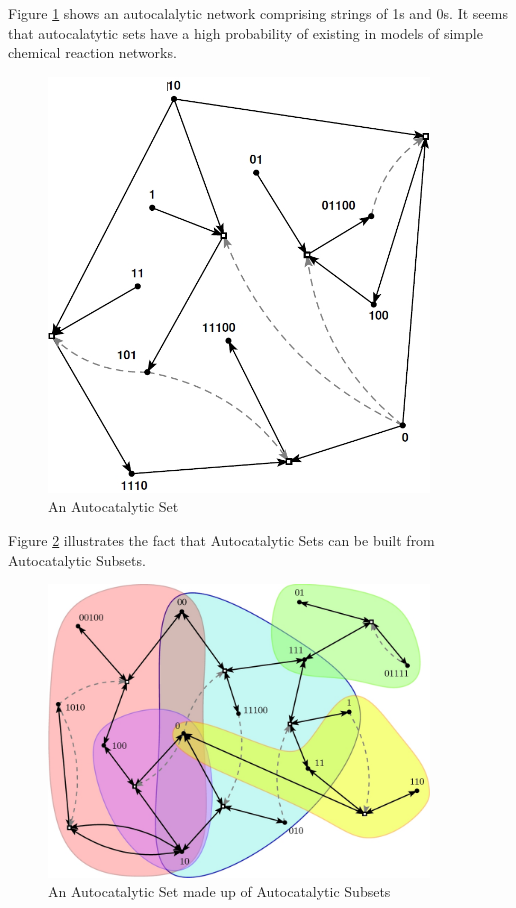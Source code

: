 \documentclass[]{article}
\begin{document}
Figure \ref{fig:AutoCatalytic2} shows an autocalalytic network comprising strings of 1s and 0s\cite{hordijk2012structure}. It seems that autocalatytic sets have a high probability of existing in models of simple chemical reaction networks.
\begin{figure}[H]
	\caption{An Autocatalytic Set}\label{fig:AutoCatalytic2}
	\includegraphics[width=0.9\textwidth]{AutoCatalytic2}
\end{figure}

Figure \ref{fig:AutoCatalyticSubsets} illustrates  the fact that Autocatalytic Sets can be built from Autocatalytic Subsets\cite{hordijk2017chasing}.
\begin{figure}[H]
	\caption{An Autocatalytic Set made up of Autocatalytic Subsets}\label{fig:AutoCatalyticSubsets}
	\includegraphics[width=0.9\textwidth]{AutoCatalyticSubsets}
\end{figure}
\end{document}

